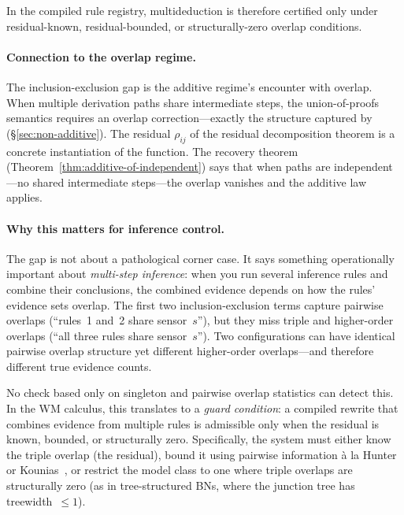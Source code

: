 \documentclass[11pt,openany]{report}
\begin{document}
\noindent
In the compiled rule registry, multideduction is therefore
certified only under residual-known, residual-bounded, or
structurally-zero overlap conditions.

\paragraph{Connection to the overlap regime.}
The inclusion-exclusion gap is the additive regime's encounter
with overlap.  When multiple derivation paths share intermediate
steps, the union-of-proofs semantics requires an overlap
correction---exactly the structure captured by
(\S\ref{sec:non-additive}).  The residual $\rho_{ij}$ of the
residual decomposition theorem is a concrete instantiation of the
 function.  The recovery theorem
(Theorem~\ref{thm:additive-of-independent}) says that when paths
are independent---no shared intermediate steps---the overlap
vanishes and the additive law applies.

\paragraph{Why this matters for inference control.}
The gap is not about a pathological corner case.  It says
something operationally important about \emph{multi-step inference}:
when you run several inference rules and combine their conclusions,
the combined evidence depends on how the rules' evidence sets
overlap.  The first two inclusion-exclusion terms capture pairwise
overlaps (``rules~1 and~2 share sensor~$s$''), but they miss triple
and higher-order overlaps (``all three rules share sensor~$s$'').
Two configurations can have identical pairwise overlap structure
yet different higher-order overlaps---and therefore different true
evidence counts.

No check based only on singleton and pairwise overlap statistics
can detect this.  In the WM calculus, this translates to a
\emph{guard condition}: a compiled rewrite that
combines evidence from multiple rules is admissible only when
the residual is known, bounded, or structurally zero.
Specifically, the system must either know the triple overlap (the
residual), bound it using pairwise information
\`a la Hunter~\cite{Hunter1976} or
Kounias~\cite{KouniasSotirakoglou1989}, or restrict the model class
to one where triple overlaps are structurally zero (as in
tree-structured BNs, where the junction tree has
treewidth~$\le 1$).
\end{document}

